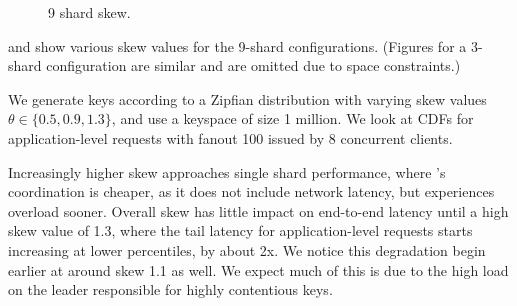 \begin{figure}[tbp]
{  \label{fig:9shardsskewlast}
}
\caption{9 shard skew.}
\end{figure}



 and
show various skew values for
the 9-shard configurations. 
(Figures for a 3-shard configuration are similar and are omitted due to space constraints.)


We generate keys according to a Zipfian
distribution with varying skew values $\theta \in \{0.5, 0.9, 1.3\}$,
and use a keyspace of size 1 million. We look at CDFs for application-level
requests with fanout 100 issued by 8 concurrent clients.

Increasingly higher skew approaches single shard performance, where \system's
coordination is cheaper, as it does not include network latency, but experiences
overload sooner.  Overall skew has little impact on end-to-end latency until a
high skew value of 1.3, where the tail latency for application-level requests
starts increasing at lower percentiles, by about 2x. We notice this degradation
begin earlier at around skew 1.1 as well. We expect much of this is due to the
high load on the leader responsible for highly contentious keys.


